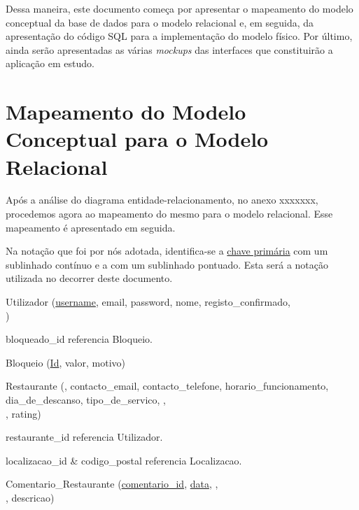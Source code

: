 \documentclass[a4paper,12pt]{report}
\begin{document}
	Dessa maneira, este documento começa por apresentar o mapeamento do modelo conceptual da base de dados para o modelo relacional e, em seguida, da apresentação do código SQL para a implementação do modelo físico. Por último, ainda serão apresentadas as várias \textit{mockups} das interfaces que constituirão a aplicação em estudo.   
	
	
\chapter{Mapeamento do Modelo Conceptual para o Modelo Relacional}

	Após a análise do diagrama entidade-relacionamento, no anexo xxxxxxx, procedemos agora ao mapeamento do mesmo para o modelo relacional. Esse mapeamento é apresentado em seguida.
	
	Na notação que foi por nós adotada, identifica-se a \underline{chave primária} com um sublinhado contínuo e a  com um sublinhado pontuado. Esta será a notação utilizada no decorrer deste documento.

\bigskip

Utilizador (\underline{username}, email, password, nome, registo\_confirmado, \\ )

\hspace*{1.5cm} bloqueado\_id referencia Bloqueio.

\medskip

Bloqueio (\underline{Id}, valor, motivo)

\medskip

Restaurante (\underline{}, contacto\_email, contacto\_telefone, horario\_funcionamento, dia\_de\_descanso, tipo\_de\_servico, ,\\ , rating)

\hspace*{1.5cm} restaurante\_id referencia Utilizador.

\hspace*{1.5cm} localizacao\_id \& codigo\_postal referencia Localizacao.

\medskip

Comentario\_Restaurante (\underline{comentario\_id}, \underline{data}, \underline{}, \\ \underline{}, descricao)
\end{document}
